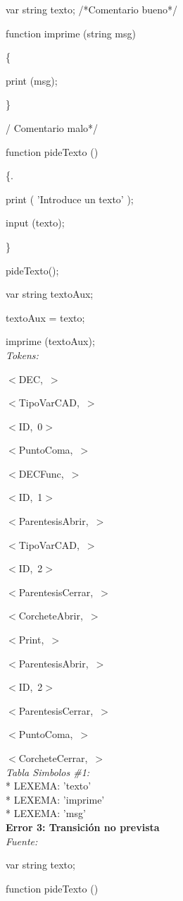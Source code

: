 \documentclass[a4paper, 12pt]{article}
\begin{document}
var string texto; /*Comentario bueno*/

 function imprime (string msg)
 
\{

	print (msg);
	
\} 

/ Comentario malo*/

function pideTexto () 

\{. 

	print ( 'Introduce un texto' ); 
	
	input (texto); 
	
\} 

 pideTexto(); 
 
var string textoAux;

textoAux = texto;

imprime (textoAux);\medskip\\
\emph{Tokens:}


\mbox{$<$DEC, $>$}


\mbox{$<$TipoVarCAD, $>$}


\mbox{$<$ID, 0$>$}


\mbox{$<$PuntoComa, $>$}


\mbox{$<$DECFunc, $>$} 


\mbox{$<$ID, 1$>$}


\mbox{$<$ParentesisAbrir, $>$}


\mbox{$<$TipoVarCAD, $>$}


\mbox{$<$ID, 2$>$}


\mbox{$<$ParentesisCerrar, $>$}


\mbox{$<$CorcheteAbrir, $>$}


\mbox{$<$Print, $>$}


\mbox{$<$ParentesisAbrir, $>$}


\mbox{$<$ID, 2$>$}


\mbox{$<$ParentesisCerrar, $>$}


\mbox{$<$PuntoComa, $>$}

\mbox{$<$CorcheteCerrar, $>$}\medskip\\
\emph{Tabla Simbolos \#1:}\\
 \mbox{*} LEXEMA: 'texto'\\
 \mbox{*} LEXEMA: 'imprime'\\
 \mbox{*} LEXEMA: 'msg'\bigskip \\
\textbf{Error 3: Transición no prevista}\\
\emph{Fuente:}

var string texto;

function pideTexto ()
\end{document}
